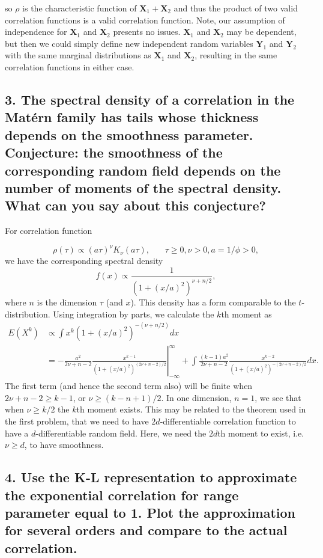 \documentclass[12pt]{article}
\newcommand{\m}[1]{\mathbf{\bm{#1}}}
\begin{document}
so $\rho$ is the characteristic function of $\m{X}_1+\m{X}_2$ and thus the product of two valid correlation functions is a valid correlation function. Note, our assumption of independence for $\m{X}_1$ and $\m{X}_2$ presents no issues. $\m{X}_1$ and $\m{X}_2$ may be dependent, but then we could simply define new independent random variables $\m{Y}_1$ and $\m{Y}_2$ with the same marginal distributions as $\m{X}_1$ and $\m{X}_2$, resulting in the same correlation functions in either case.

\subsection*{3. The spectral density of a correlation in the Mat{\'e}rn family has tails whose thickness depends on the smoothness parameter. Conjecture: the smoothness of the corresponding random field depends on the number of moments of the spectral density. What can you say about this conjecture?}

For correlation function

\[ \rho(\tau) \propto (a\tau)^\nu K_\nu(a\tau),~~~~~~~~\tau\geq0,\nu>0,a=1/\phi>0, \]
we have the corresponding spectral density
\[ f(x) \propto \frac{1}{\left(1+(x/a)^2\right)^{\nu+n/2}}, \]
where $n$ is the dimension $\tau$ (and $x$). This density has a form comparable to the $t$-distribution. Using integration by parts, we calculate the $k$th moment as
\begin{align*}
E(X^k) &\propto \int x^k(1+(x/a)^2)^{-(\nu+n/2)} dx \\
 &= \left.-\frac{a^2}{2\nu+n-2}\frac{x^{k-1}}{(1+(x/a)^2)^{(2\nu+n-2)/2}}\right\vert_{-\infty}^{\infty}+\int\frac{(k-1)a^2}{2\nu+n-2}\frac{x^{k-2}}{(1+(x/a)^2)^{-(2\nu+n-2)/2}} dx.
\end{align*}
The first term (and hence the second term also) will be finite when $2\nu+n-2\geq k-1$, or $\nu\geq(k-n+1)/2$. In one dimension, $n=1$, we see that when $\nu \geq k/2$ the $k$th moment exists. This may be related to the theorem used in the first problem, that we need to have $2d$-differentiable correlation function to have a $d$-differentiable random field. Here, we need the $2d$th moment to exist, i.e. $\nu\geq d$, to have smoothness.

\subsection*{4. Use the K-L representation to approximate the exponential correlation for range parameter equal to 1. Plot the approximation for several orders and compare to the actual correlation.}
\end{document}
